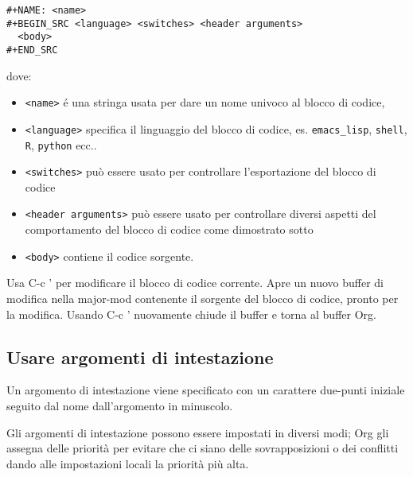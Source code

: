 \documentclass[11pt]{article}
\begin{document}
\begin{verbatim}
#+NAME: <name>
#+BEGIN_SRC <language> <switches> <header arguments>
  <body>
#+END_SRC
\end{verbatim}

dove:

\begin{itemize}
\item \texttt{<name>} é una stringa usata per dare un nome univoco al blocco di
codice,
\item \texttt{<language>} specifica il linguaggio del blocco di codice,
es. \texttt{emacs\_lisp}, \texttt{shell}, \texttt{R}, \texttt{python} ecc..
\item \texttt{<switches>} può essere usato per controllare l'esportazione del
blocco di codice
\item \texttt{<header arguments>} può essere usato per controllare diversi
aspetti del comportamento del blocco di codice come dimostrato sotto
\item \texttt{<body>} contiene il codice sorgente.
\end{itemize}

Usa C-c ' per modificare il blocco di codice corrente. Apre
un nuovo buffer di modifica nella major-mod contenente il sorgente del
blocco di codice, pronto per la modifica. Usando C-c '
nuovamente chiude il buffer e torna al buffer Org.

\subsection*{Usare argomenti di intestazione}
\label{sec:org1a787ab}
Un argomento di intestazione viene specificato con un carattere
due-punti iniziale seguito dal nome dall'argomento in minuscolo.

Gli argomenti di intestazione possono essere impostati in diversi
modi; Org gli assegna delle priorità per evitare che ci siano delle
sovrapposizioni o dei conflitti dando alle impostazioni locali la
priorità più alta.
\end{document}
